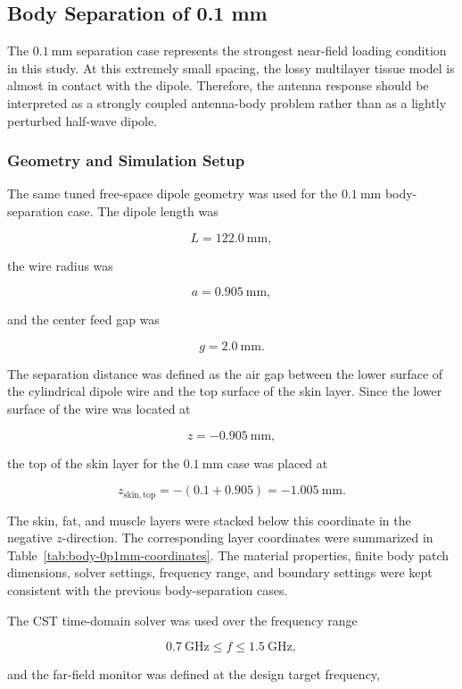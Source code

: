 \subsection{Body Separation of 0.1 mm}

The \(0.1~\mathrm{mm}\) separation case represents the strongest near-field loading condition in this study. At this extremely small spacing, the lossy multilayer tissue model is almost in contact with the dipole. Therefore, the antenna response should be interpreted as a strongly coupled antenna-body problem rather than as a lightly perturbed half-wave dipole.

\subsubsection{Geometry and Simulation Setup}

The same tuned free-space dipole geometry was used for the \(0.1~\mathrm{mm}\) body-separation case. The dipole length was

\[
L = 122.0~\mathrm{mm},
\]

the wire radius was

\[
a = 0.905~\mathrm{mm},
\]

and the center feed gap was

\[
g = 2.0~\mathrm{mm}.
\]

The separation distance was defined as the air gap between the lower surface of the cylindrical dipole wire and the top surface of the skin layer. Since the lower surface of the wire was located at

\[
z=-0.905~\mathrm{mm},
\]

the top of the skin layer for the \(0.1~\mathrm{mm}\) case was placed at

\[
z_{\mathrm{skin,top}}
=
-(0.1+0.905)
=
-1.005~\mathrm{mm}.
\]

The skin, fat, and muscle layers were stacked below this coordinate in the negative \(z\)-direction. The corresponding layer coordinates were summarized in Table~\ref{tab:body-0p1mm-coordinates}. The material properties, finite body patch dimensions, solver settings, frequency range, and boundary settings were kept consistent with the previous body-separation cases.

The CST time-domain solver was used over the frequency range

\[
0.7~\mathrm{GHz} \leq f \leq 1.5~\mathrm{GHz},
\]

and the far-field monitor was defined at the design target frequency,

